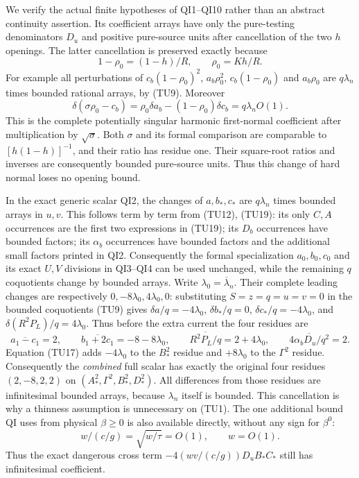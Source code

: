 We verify the actual finite hypotheses of QI1--QI10 rather than
an abstract continuity assertion.  Its coefficient arrays have
only the pure-testing denominators $D_u$ and positive pure-source
units after cancellation of the two $h$ openings.  The latter
cancellation is preserved exactly because
\[
 1-\rho_0=(1-h)/R,\qquad \rho_0=Kh/R.
                                                               \tag{TU19}
\]
For example all perturbations of
$c_b(1-\rho_0)^2$, $a_b\rho_0^2$,
$c_b(1-\rho_0)$ and $a_b\rho_0$ are $q\lambda_n$
times bounded rational arrays, by (TU9).  Moreover
\[
 \delta(\sigma\rho_0-c_b)
       =\rho_0\delta a_b-(1-\rho_0)\delta c_b
                             =q\lambda_n O(1).
                                                               \tag{TU20}
\]
This is the complete potentially singular harmonic first-normal
coefficient after multiplication by $\sqrt\sigma$.
Both $\sigma$ and its formal comparison are comparable to
$[h(1-h)]^{-1}$, and their ratio has residue one.
Their square-root ratios and inverses are consequently bounded
pure-source units.  Thus this change of hard normal loses no
opening bound.

In the exact generic scalar QI2, the changes of $a,b_*,c_*$ are
$q\lambda_n$ times bounded arrays in $u,v$.  This follows term by
term from (TU12), (TU19): its only $C,A$ occurrences are the first
two expressions in (TU19); its $D_b$ occurrences have bounded
factors; its $\alpha_b$ occurrences have bounded factors and the
additional small factors printed in QI2.  Consequently the
formal specialization $a_0,b_0,c_0$ and its exact $U,V$ divisions
in QI3--QI4 can be used unchanged, while the remaining $q$
coquotients change by bounded arrays.  Write
$\lambda_0=\overline\lambda_n$.  Their complete leading changes
are respectively $0,-8\lambda_0,4\lambda_0,0$: substituting
$S=z=q=u=v=0$ in the bounded coquotients (TU9) gives
$\delta a/q=-4\lambda_0$, $\delta b_*/q=0$,
$\delta c_*/q=-4\lambda_0$, and
$\delta(R^2P_L)/q=4\lambda_0$.  Thus before the extra current
the four residues are
\[
 \overline{a_1-c_1}=2,\qquad
 \overline{b_1+2c_1}=-8-8\lambda_0,\qquad
 \overline{R^2P_L/q}=2+4\lambda_0,\qquad
 \overline{4\alpha_bD_u/q^2}=2.
                                                               \tag{TU21}
\]
Equation (TU17) adds $-4\lambda_0$ to the $B_*^2$ residue
and $+8\lambda_0$ to the $\Gamma^2$ residue.  Consequently
the \emph{combined} full scalar has exactly the original four
residues $(2,-8,2,2)$ on $(A_*^2,\Gamma^2,B_*^2,D_*^2)$.
All differences from those residues are infinitesimal bounded
arrays, because $\lambda_n$ itself is bounded.  This cancellation
is why a thinness assumption is unnecessary on (TU1).
The one additional bound QI uses from physical $\beta\geq0$ is
also available directly, without any sign for $\beta^0$:
\[
  w/(c/g)=\sqrt{w/\tau}=O(1),\qquad w=O(1).
                                                               \tag{TU22}
\]
Thus the exact dangerous cross term $-4(wv/(c/g))D_uB_*C_*$
still has infinitesimal coefficient.

